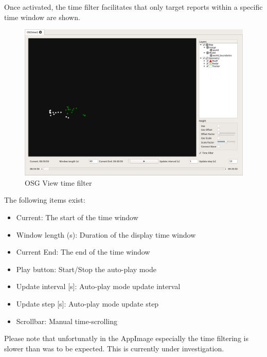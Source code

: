 \documentclass[10pt,letterpaper,extrafontsizes]{memoir}
\begin{document}
{Once activated, the time filter facilitates that only target reports within a specific time window are shown.


\begin{figure}[H]
    \hspace*{-2cm}
    \includegraphics[width=18cm]{../screenshots/osgview_time_filter.png}
  \caption{OSG View time filter}
  \label{fig:osgview_time_filter}
\end{figure}

The following items exist:

\begin{itemize}
 \item Current: The start of the time window
 \item Window length (s): Duration of the display time window
 \item Current End: The end of the time window
 \item Play button: Start/Stop the auto-play mode
 \item Update interval [s]: Auto-play mode update interval
 \item Update step [s]: Auto-play mode update step
 \item Scrollbar: Manual time-scrolling
\end{itemize}

Please note that unfortunatly in the AppImage especially the time filtering is slower than was to be expected. This is currently under investigation.



}
\end{document}
